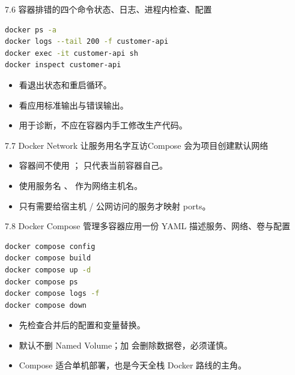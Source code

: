 \begin{frame}[fragile]{7.6 容器排错的四个命令}{状态、日志、进程内检查、配置}
  \begin{lstlisting}[language=bash]
docker ps -a
docker logs --tail 200 -f customer-api
docker exec -it customer-api sh
docker inspect customer-api
  \end{lstlisting}
  \begin{itemize}
    \item {} 看退出状态和重启循环。
    \item {} 看应用标准输出与错误输出。
    \item {} 用于诊断，不应在容器内手工修改生产代码。
  \end{itemize}
\end{frame}

\begin{frame}{7.7 Docker Network 让服务用名字互访}{Compose 会为项目创建默认网络}
  \centering
  \par\medskip
  \begin{itemize}
    \item 容器间不使用 ； 只代表当前容器自己。
    \item 使用服务名 、 作为网络主机名。
    \item 只有需要给宿主机 / 公网访问的服务才映射 ports。
  \end{itemize}
\end{frame}

\begin{frame}[fragile]{7.8 Docker Compose 管理多容器应用}{一份 YAML 描述服务、网络、卷与配置}
  \begin{lstlisting}[language=bash]
docker compose config
docker compose build
docker compose up -d
docker compose ps
docker compose logs -f
docker compose down
  \end{lstlisting}
  \begin{itemize}
    \item {} 先检查合并后的配置和变量替换。
    \item {} 默认不删 Named Volume；加  会删除数据卷，必须谨慎。
    \item Compose 适合单机部署，也是今天全栈 Docker 路线的主角。
  \end{itemize}
\end{frame}
